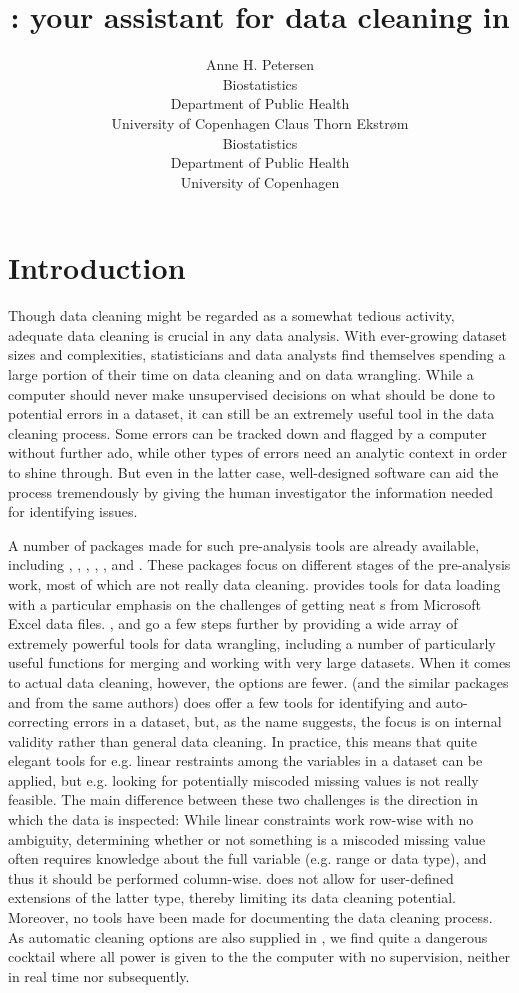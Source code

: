 \documentclass[article,shortnames]{jss}
\author{Anne H. Petersen\\Biostatistics\\Department of Public
  Health\\University of Copenhagen \And Claus Thorn Ekstr\o m\\Biostatistics\\Department of Public
  Health\\University of Copenhagen}
\title{\pkg{dataMaid}: your assistant for data cleaning in \proglang{R}}
\begin{document}
\section{Introduction}
Though data cleaning might be regarded as a somewhat tedious activity,
adequate data cleaning is crucial in any data analysis. With
ever-growing dataset sizes and complexities, statisticians and data
analysts find themselves spending a large portion of their time on
data cleaning and on data wrangling. While a computer should never
make unsupervised decisions on what should be done to potential
errors in a dataset, it can still be an extremely useful tool in the
data cleaning process. Some errors can be tracked down and flagged by a
computer without further ado, while other types of errors need an analytic
context in order to shine through. But even in the latter case, well-designed
software can aid the process tremendously by giving the human investigator the
information needed for identifying issues.


A number of  packages made for such pre-analysis tools are
already available, including  \citep{janitor}, 
\citep{plyr},  \citep{data.table}, 
\citep{DataCombine} ,  \citep{validate}, and
 \citep{DataExplorer}. These packages focus on
different stages of the pre-analysis work, most of which are not
really data cleaning.   provides tools for data loading
with a particular emphasis on the challenges of getting neat
s from Microsoft Excel data files. ,
 and  go a few steps further by
providing a wide array of extremely powerful tools for data wrangling,
including a number of particularly useful functions for merging and
working with very large datasets. When it comes to actual data
cleaning, however, the options are fewer.   (and the
similar packages  and  from the same
authors) does offer a few tools for identifying and auto-correcting
errors in a dataset, but, as the name suggests, the focus is on
internal validity rather than general data cleaning. In practice, this
means that quite elegant tools for e.g. linear restraints among the
variables in a dataset can be applied, but e.g. looking for
potentially miscoded missing values is not really feasible. The main
difference between these two challenges is the direction in which the
data is inspected: While linear constraints work row-wise with no
ambiguity, determining whether or not something is a miscoded missing
value often requires knowledge about the full variable (e.g. range or
data type), and thus it should be performed
column-wise.  does not allow for user-defined extensions
of the latter type, thereby limiting its data cleaning potential.
Moreover, no tools have been made for documenting the data cleaning
process.  As automatic cleaning options are also supplied in
, we find quite a dangerous cocktail where all power is
given to the the computer with no supervision, neither in real time
nor subsequently.
\end{document}

